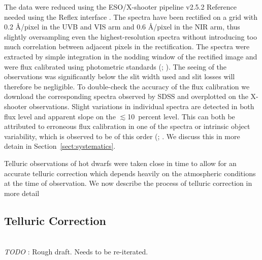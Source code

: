 \documentclass{aa}    %
\newcommand{\tablabel}[1]{\label{tab:#1}}
\newcommand{\sectionname}{Section}
\newcommand{\Sect}[1]{\sectionname~\ref{sect:#1}}
\newcommand{\sect}[1]{\Sect{#1}}
\newcommand{\sectlabel}[1]{\label{sect:#1}}
\newcommand{\todo}[3]{{\color{#2}\emph{#1}: #3}}
\newcommand{\jstodo}[1]{\todo{ \\TODO }{red}{#1}}
\begin{document}
The data were reduced using the ESO/X-shooter pipeline v2.5.2 {\color{red} Reference needed} using the Reflex interface \citep{Freudling2013}. The spectra have been rectified on a grid with 0.2 \AA/pixel in the UVB and VIS arm and 0.6 \AA/pixel in the NIR arm, thus slightly oversampling even the highest-resolution spectra without introducing too much correlation between adjacent pixels in the rectification. The spectra were extracted by simple integration in the nodding window of the rectified image and were flux calibrated using photometric standards (\cite{Vernet2010}; \cite{Hamuy1994}). The seeing of the observations was significantly below the slit width used and slit losses will therefore be negligible. To double-check the accuracy of the flux calibration we download the corresponding spectra observed by SDSS \citep{Ahn2014} and overplotted on the X-shooter observations. Slight variations in individual spectra are detected in both flux level and apparent slope on the $\lesssim$10~percent level. This can both be attributed to erroneous flux calibration in one of the spectra or intrinsic object variability, which is observed to be of this order (\cite{MacLeod2012}; \cite{Morganson2014}. We discuss this in more detain in \sect{systematics}.

Telluric observations of hot dwarfs were taken close in time to allow for an accurate telluric correction which depends heavily on the atmospheric conditions at the time of observation. We now describe the process of telluric correction in more detail



 \tablabel{targs}



\subsection{Telluric Correction}   \sectlabel{telluric}
\jstodo{Rough draft. Needs to be re-iterated.}
\end{document}
